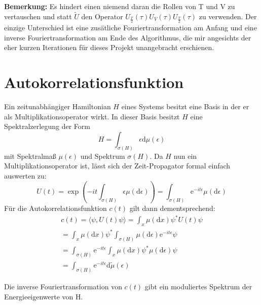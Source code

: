 \documentclass[10pt,a4paper,german]{scrartcl}
\begin{document}
		\textbf{Bemerkung:} Es hindert einen niemend daran die Rollen von T und V zu
		vertauschen	und statt $\tilde{U}$ den Operator
		$U_{\frac{T}{2}}(\tau) U_V(\tau) U_{\frac{T}{2}}(\tau)$ zu verwenden. Der einzige
		Unterschied ist eine zusätliche Fouriertransformation am Anfang und eine
		inverse Fouriertransformation am Ende des Algorithmus, die mir angesichts der
		eher kurzen Iterationen für dieses Projekt unangebracht erschienen.


  \section{Autokorrelationsfunktion}
		Ein zeitunabhängiger Hamiltonian $H$ eines Systems besitzt eine Basis in der er als
		Multiplikationsoperator wirkt. In dieser Basis besitzt $H$ eine Spektralzerlegung
		der Form
		\begin{equation*}
			H = \int_{\sigma(H)}{\epsilon \mathrm{d}\mu(\epsilon)}
		\end{equation*}
		mit Spektralmaß $\mu(\epsilon)$ und Spektrum $\sigma(H)$.
		Da $H$ nun ein Multiplikationsoperator ist, lässt sich der
		Zeit-Propagator formal einfach auswerten zu:
		\begin{equation*}
			U(t)=\exp\left(
				-i t \int_{\sigma(H)}{\epsilon \mu(\mathrm{d}\epsilon)}
			\right)
			=\int_{\sigma(H)}{\mathrm{e}^{-i t \epsilon} \mu(\mathrm{d}\epsilon)}
		\end{equation*}
		Für die Autokorrelationsfunktion $c(t)$
		gilt dann dementsprechend:
		\begin{multline}
			\label{eq:corr}
			c(t) = \langle \psi,U(t) \psi\rangle
					 = \int_{x} \mu(\mathrm{d}x) \psi^{*} U(t) \psi \\
					 = \int_{x}  \mu(\mathrm{d}x) \psi^{*}
					 	  \int_{\sigma(H)}{\mu(\mathrm{d}\epsilon) \mathrm{e}^{-i t \epsilon}} \psi \\
					 = \int_{\sigma(H)}{
					 			\mathrm{e}^{-i t \epsilon}
					 			\int_{x}  \mu(\mathrm{d}x) \psi^{*}
					 	 	   \mu(\mathrm{d}\epsilon)} \psi \\
					 = \int_{\sigma(H)}{
					 			\mathrm{e}^{-i t \epsilon}
					 			\mathrm{d} \tilde{\mu}(\epsilon)}
		\end{multline}

		Die inverse Fouriertransformation von $c(t)$ gibt ein moduliertes Spektrum
		der Energieeigenwerte von H.
\end{document}
